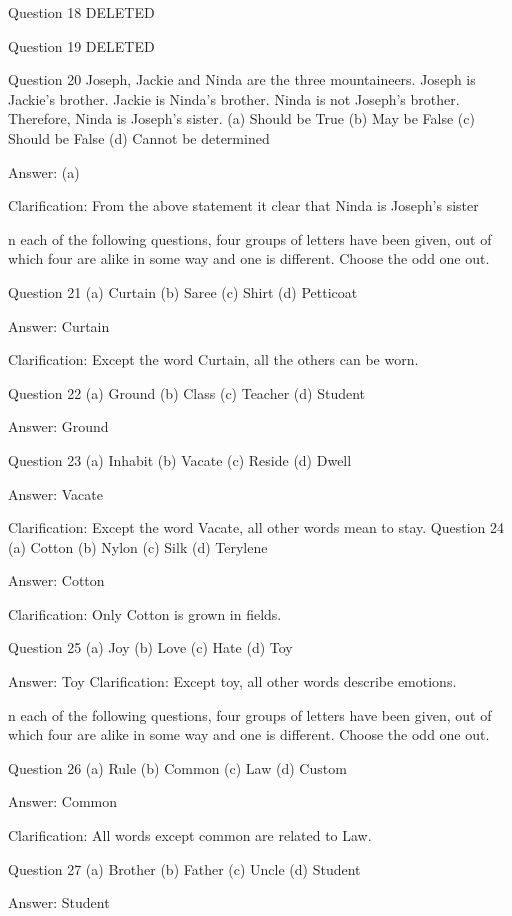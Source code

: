 Question 18
DELETED

Question 19
DELETED

Question 20 Joseph, Jackie and Ninda are the three mountaineers. Joseph is Jackie’s brother. Jackie is Ninda’s brother. Ninda is not Joseph’s brother. Therefore, Ninda is Joseph’s sister.
(a) Should be True
(b) May be False
(c) Should be False
(d) Cannot be determined

Answer: (a)

Clarification: From the above statement it clear that Ninda is Joseph’s sister




n each of the following questions, four groups of letters have been given, out of which four are alike in some way and one is different. Choose the odd one out.

Question 21
(a) Curtain
(b) Saree
(c) Shirt
(d) Petticoat

Answer: Curtain

Clarification: Except the word Curtain, all the others can be worn.

Question 22
(a) Ground
(b) Class
(c) Teacher
(d) Student

Answer: Ground

Question 23
(a) Inhabit
(b) Vacate
(c) Reside
(d) Dwell

Answer: Vacate

Clarification: Except the word Vacate, all other words mean to stay.
Question 24 (a) Cotton
(b) Nylon
(c) Silk
(d) Terylene

Answer: Cotton

Clarification: Only Cotton is grown in fields.

Question 25
(a) Joy
(b) Love
(c) Hate
(d) Toy

Answer: Toy
Clarification: Except toy, all other words describe emotions. 



n each of the following questions, four groups of letters have been given, out of which four are alike in some way and one is different. Choose the odd one out.

Question 26
(a) Rule
(b) Common
(c) Law
(d) Custom

Answer: Common

Clarification: All words except common are related to Law.

Question 27
(a) Brother
(b) Father
(c) Uncle
(d) Student

Answer: Student

